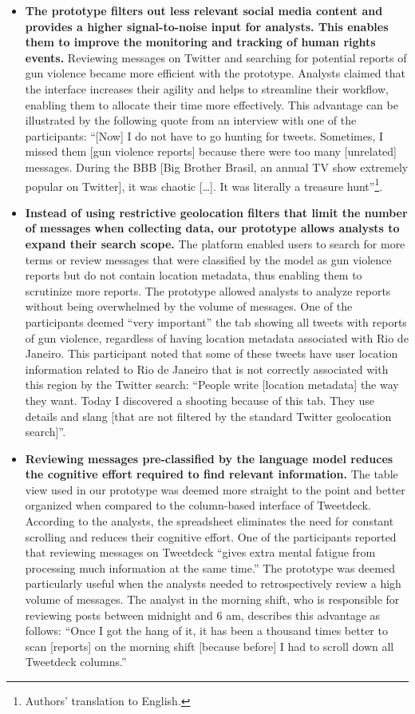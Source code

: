 \documentclass[11pt,letterpaper]{article}
\begin{document}
\begin{itemize}
    \item \textbf{The prototype filters out less relevant social media content and provides a higher signal-to-noise input for analysts. This enables them to improve the monitoring and tracking of human rights events.} Reviewing messages on Twitter and searching for potential reports of gun violence became more efficient with the prototype. Analysts claimed that the interface increases their agility and helps to streamline their workflow, enabling them to allocate their time more effectively. This advantage can be illustrated by the following quote from an interview with one of the participants: ``[Now] I do not have to go hunting for tweets. Sometimes, I missed them [gun violence reports] because there were too many [unrelated] messages. During the BBB [Big Brother Brasil, an annual TV show extremely popular on Twitter], it was chaotic […]. It was literally a treasure hunt''\footnote{Authors' translation to English.}.

    \item \textbf{Instead of using restrictive geolocation filters that limit the number of messages when collecting data, our prototype allows analysts to expand their search scope.} The platform enabled users to search for more terms or review messages that were classified by the model as gun violence reports but do not contain location metadata, thus enabling them to scrutinize more reports. The prototype allowed analysts to analyze reports without being overwhelmed by the volume of messages. One of the participants deemed ``very important'' the tab showing all tweets with reports of gun violence, regardless of having location metadata associated with Rio de Janeiro. This participant noted that some of these tweets have user location information related to Rio de Janeiro that is not correctly associated with this region by the Twitter search: ``People write [location metadata] the way they want. Today I discovered a shooting because of this tab. They use details and slang [that are not filtered by the standard Twitter geolocation search]''.

    \item \textbf{Reviewing messages pre-classified by the language model reduces the cognitive effort required to find relevant information.} The table view used in our prototype was deemed more straight to the point and better organized when compared to the column-based interface of Tweetdeck. According to the analysts, the spreadsheet eliminates the need for constant scrolling and reduces their cognitive effort. One of the participants reported that reviewing messages on Tweetdeck ``gives extra mental fatigue from processing much information at the same time.” The prototype was deemed particularly useful when the analysts needed to retrospectively review a high volume of messages. The analyst in the morning shift, who is responsible for reviewing posts between midnight and 6 am, describes this advantage as follows: ``Once I got the hang of it, it has been a thousand times better to scan [reports] on the morning shift [because before] I had to scroll down all Tweetdeck columns.''


\end{itemize}
\end{document}
